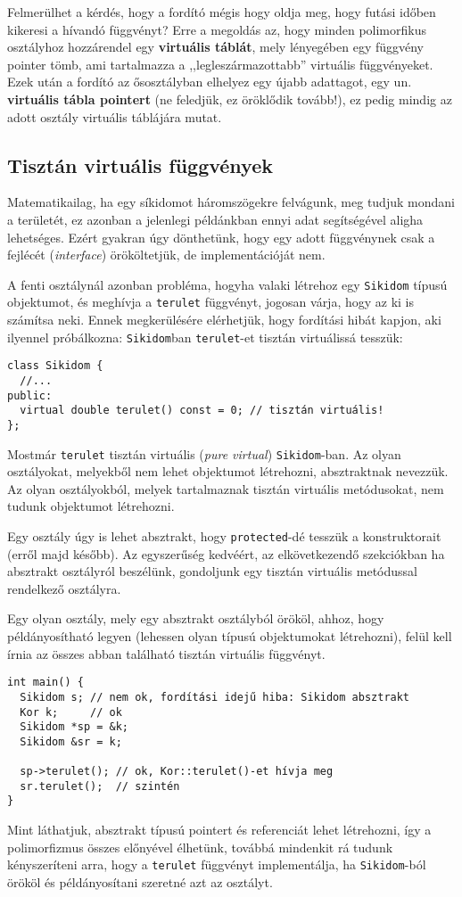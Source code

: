 \documentclass[../cpp_book/cpp_book.tex]{subfiles}
\begin{document}
	\medskip
	Felmerülhet a kérdés, hogy a fordító mégis hogy oldja meg, hogy futási időben kikeresi a hívandó függvényt? Erre a megoldás az, hogy minden polimorfikus osztályhoz hozzárendel egy \textbf{virtuális táblát}, mely lényegében egy függvény pointer tömb, ami tartalmazza a ,,legleszármazottabb'' virtuális függvényeket. Ezek után a fordító az ősosztályban elhelyez egy újabb adattagot, egy un. \textbf{virtuális tábla pointert} (ne feledjük, ez öröklődik tovább!), ez pedig mindig az adott osztály virtuális táblájára mutat.
	\subsection{Tisztán virtuális függvények}
	Matematikailag, ha egy síkidomot háromszögekre felvágunk, meg tudjuk mondani a területét, ez azonban a jelenlegi példánkban ennyi adat segítségével aligha lehetséges. Ezért gyakran úgy dönthetünk, hogy egy adott függvénynek csak a fejlécét (\textit{interface}) örököltetjük, de implementációját nem.
	
	A fenti osztálynál azonban probléma, hogyha valaki létrehoz egy \texttt{Sikidom} típusú objektumot, és meghívja a \texttt{terulet} függvényt, jogosan várja, hogy az ki is számítsa neki. Ennek megkerülésére elérhetjük, hogy fordítási hibát kapjon, aki ilyennel próbálkozna: \texttt{Sikidom}ban \texttt{terulet}-et tisztán virtuálissá tesszük:
	
\begin{lstlisting}
class Sikidom {
  //...
public:
  virtual double terulet() const = 0; // tisztán virtuális!
};
\end{lstlisting}
	Mostmár \texttt{terulet} tisztán virtuális (\textit{pure virtual}) \texttt{Sikidom}-ban. Az olyan osztályokat, melyekből nem lehet objektumot létrehozni, absztraktnak nevezzük. Az olyan osztályokból, melyek tartalmaznak tisztán virtuális metódusokat, nem tudunk objektumot létrehozni.
	\begin{note}
		Egy osztály úgy is lehet absztrakt, hogy \texttt{protected}-dé tesszük a konstruktorait (erről majd később). Az egyszerűség kedvéért, az elkövetkezendő szekciókban ha absztrakt osztályról beszélünk, gondoljunk egy tisztán virtuális metódussal rendelkező osztályra.
	\end{note}
	Egy olyan osztály, mely egy absztrakt osztályból örököl, ahhoz, hogy példányosítható legyen (lehessen olyan típusú objektumokat létrehozni), felül kell írnia az összes abban található tisztán virtuális függvényt.
	\begin{lstlisting}
int main() {
  Sikidom s; // nem ok, fordítási idejű hiba: Sikidom absztrakt
  Kor k;     // ok
  Sikidom *sp = &k;
  Sikidom &sr = k;

  sp->terulet(); // ok, Kor::terulet()-et hívja meg
  sr.terulet();  // szintén
}
	\end{lstlisting}
	Mint láthatjuk, absztrakt típusú pointert és referenciát lehet létrehozni, így a polimorfizmus összes előnyével élhetünk, továbbá mindenkit rá tudunk kényszeríteni arra, hogy a \texttt{terulet} függvényt implementálja, ha \texttt{Sikidom}-ból örököl és példányosítani szeretné azt az osztályt.
	
\end{document}
